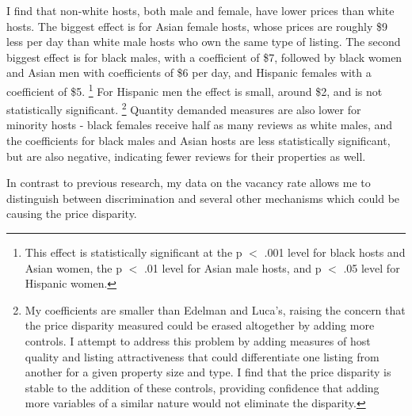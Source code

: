 I find that non-white hosts, both male and female, have lower prices than white hosts. The biggest effect is for Asian female hosts, whose prices are roughly \$9 less per day than white male hosts who own the same type of listing. The second biggest effect is for black males, with a coefficient of \$7, followed by black women and Asian men with coefficients of \$6 per day, and Hispanic females with a coefficient of \$5.%
	\footnote{This effect is statistically significant at the p $<$ .001 level for black hosts and Asian women, the p $<$ .01 level for Asian male hosts, and p $<$ .05 level for Hispanic women.} 
For Hispanic men the effect is small, around \$2, and is not statistically significant.%
	\footnote{My coefficients are smaller than Edelman and Luca's, raising the concern that the price disparity measured could be erased altogether by adding more controls. I attempt to address this problem by adding measures of host quality and listing attractiveness that could differentiate one listing from another for a given property size and type. I find that the price disparity is stable to the addition of these controls, providing confidence that adding more variables of a similar nature would not eliminate the disparity.}
Quantity demanded measures are also lower for minority hosts - black females receive half as many reviews as white males, and the coefficients for black males and Asian hosts are less statistically significant, but are also negative, indicating fewer reviews for their properties as well.

In contrast to previous research, my data on the vacancy rate allows me to distinguish between discrimination and several other mechanisms which could be causing the price disparity. 

